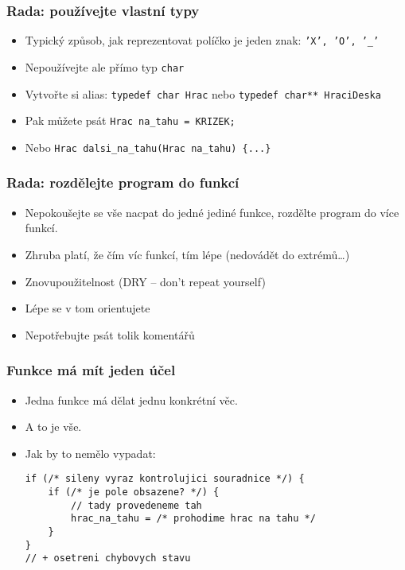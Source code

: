 \documentclass{beamer}
\newenvironment{itemizex}%
  {\large \begin{itemize}%
    \setlength{\itemsep}{8pt}%
    \setlength{\parskip}{8pt}}%
  {\end{itemize}}
\begin{document}
\begin{frame}[t,fragile]\frametitle{Rada: používejte vlastní typy} 
    \begin{itemizex}
        \item Typický způsob, jak reprezentovat políčko je jeden znak: \texttt{'X', 'O', '\_'}
        \item Nepoužívejte ale přímo typ \texttt{char}
        \item Vytvořte si alias: \texttt{typedef char Hrac} nebo \texttt{typedef char** HraciDeska}
        \item Pak můžete psát \texttt{Hrac na\_tahu = KRIZEK;}
        \item Nebo \texttt{Hrac dalsi\_na\_tahu(Hrac na\_tahu) \{...\}}
    \end{itemizex}
\end{frame}

\begin{frame}[t,fragile]\frametitle{Rada: rozdělejte program do funkcí} 
    \begin{itemizex}
        \item Nepokoušejte se vše nacpat do jedné jediné funkce, rozdělte program do více funkcí.
        \item Zhruba platí, že čím víc funkcí, tím lépe (nedovádět do extrémů\dots)
        \item Znovupoužitelnost (DRY -- don't repeat yourself)
        \item Lépe se v tom orientujete
        \item Nepotřebujte psát tolik komentářů
    \end{itemizex}
\end{frame}


\begin{frame}[t,fragile]\frametitle{Funkce má mít jeden účel} 
    \begin{itemizex}
        \item Jedna funkce má dělat jednu konkrétní věc. 
        \item A to je vše. 
        \item Jak by to nemělo vypadat:
\begin{verbatim} 
if (/* sileny vyraz kontrolujici souradnice */) {
    if (/* je pole obsazene? */) {
        // tady provedeneme tah
        hrac_na_tahu = /* prohodime hrac na tahu */
    }
}
// + osetreni chybovych stavu
\end{verbatim}
    \end{itemizex}
\end{frame}
\end{document}

